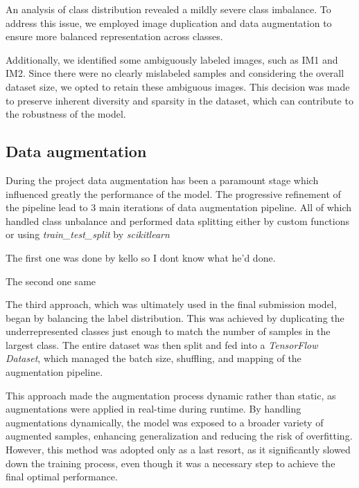 \documentclass[11pt]{article}
\begin{document}
An analysis of class distribution revealed a mildly severe class imbalance. To address this issue, we employed image duplication and data augmentation to ensure more balanced representation across classes.

Additionally, we identified some ambiguously labeled images, such as IM1 and IM2. Since there were no clearly mislabeled samples and considering the overall dataset size, we opted to retain these ambiguous images. This decision was made to preserve inherent diversity and sparsity in the dataset, which can contribute to the robustness of the model.

\begin{figure}

\end{figure}

\subsection{Data augmentation}

During the project data augmentation has been a paramount stage which influenced greatly the performance of the model. The progressive refinement of the pipeline lead to 3 main iterations of data augmentation pipeline.
All of which handled class unbalance and performed data splitting either by custom functions or using \textit{train\_test\_split} by \textit{scikit\-learn}

The first one was done by kello so I dont know what he'd done.

The second one same

The third approach, which was ultimately used in the final submission model, began by balancing the label distribution. This was achieved by duplicating the underrepresented classes just enough to match the number of samples in the largest class. The entire dataset was then split and fed into a \textit{TensorFlow Dataset}, which managed the batch size, shuffling, and mapping of the augmentation pipeline.

This approach made the augmentation process dynamic rather than static, as augmentations were applied in real-time during runtime. By handling augmentations dynamically, the model was exposed to a broader variety of augmented samples, enhancing generalization and reducing the risk of overfitting. However, this method was adopted only as a last resort, as it significantly slowed down the training process, even though it was a necessary step to achieve the final optimal performance.
\end{document}
